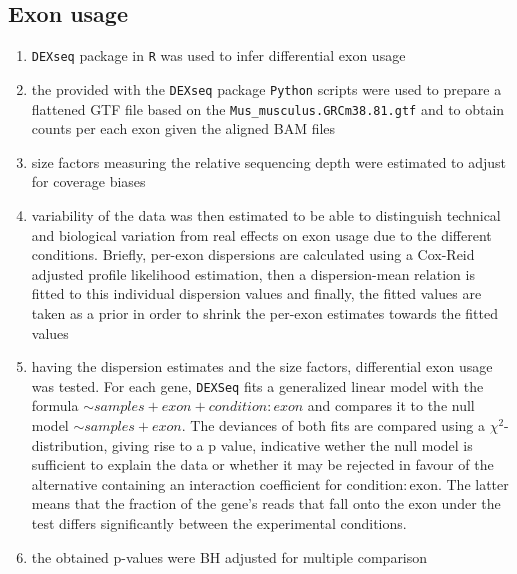 \documentclass[12pt]{article}
\newcommand{\refAnnotation}{\texttt{Mus\_musculus.GRCm38.81.gtf}}
\begin{document}
\subsection{Exon usage}
\begin{enumerate}
  \item \texttt{DEXseq} package in \texttt{R} was used to infer differential exon usage
  \item the provided with the \texttt{DEXseq} package \texttt{Python} scripts were used to prepare a flattened GTF file based on the {\refAnnotation} and to obtain counts per each exon given the aligned BAM files
  \item size factors measuring the relative sequencing depth were estimated to adjust for coverage biases
  \item variability of the data was then estimated to be able to distinguish technical and biological variation from real effects on exon usage due to the different conditions. Briefly, per-exon dispersions are calculated using a Cox-Reid adjusted profile likelihood estimation, then a dispersion-mean relation is fitted to this individual dispersion values and finally, the fitted values are taken as a prior in order to shrink the per-exon estimates towards the fitted values
  \item having the dispersion estimates and the size factors, differential exon usage was tested. For each gene, \texttt{DEXSeq} fits a generalized linear model with the formula \( \sim samples + exon + condition:exon\) and compares it to the null model  \( \sim samples + exon\). The deviances of both fits are compared using a $\chi^2$-distribution, giving rise to a p value, indicative wether the null model is sufficient to explain the data or whether it may be rejected in favour of the alternative containing an interaction coefficient for condition$\colon$exon. The latter means that the fraction of the gene's reads that fall onto the exon under the test differs significantly between the experimental conditions.
  \item the obtained p-values were BH adjusted for multiple comparison
\end{enumerate}
\end{document}
